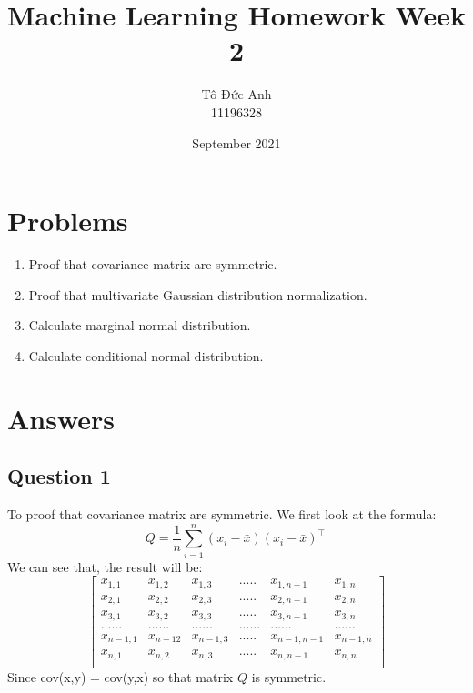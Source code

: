 \documentclass{article}
\title{Machine Learning Homework Week 2}
\author{Tô Đức Anh \\ 11196328 }
\date{September 2021}
\begin{document}
\maketitle

\section{Problems}
    \begin{enumerate}
        \item Proof that covariance matrix are symmetric.
        \item Proof that multivariate Gaussian distribution normalization.
        \item Calculate marginal normal distribution.
        \item Calculate conditional normal distribution.

    \end{enumerate}

\section{Answers}
    \subsection{Question 1}
        To proof that covariance matrix are symmetric. We first look at the formula:
        $$
            Q = \frac{1}{n} \sum_{i=1}^n (x_i-\bar{x})(x_i-\bar{x})^\top \,
        $$
        We can see that, the result will be:
        $$
            \begin{bmatrix}
                x_{1,1} & x_{1,2} & x_{1,3} & ..... & x_{1,n-1} & x_{1,n}\\
                x_{2,1} & x_{2,2} & x_{2,3} & ..... & x_{2,n-1} & x_{2,n}\\
                x_{3,1} & x_{3,2} & x_{3,3} & ..... & x_{3,n-1} & x_{3,n}\\
                ......&......&......&......&......&......\\
                x_{n-1,1} & x_{n-12} & x_{n-1,3} & ..... & x_{n-1,n-1} & x_{n-1,n}\\
                x_{n,1} & x_{n,2} & x_{n,3} & ..... & x_{n,n-1} & x_{n,n}\\
            \end{bmatrix}
        $$
        Since cov(x,y) = cov(y,x) so that matrix $Q$ is symmetric.
\end{document}
